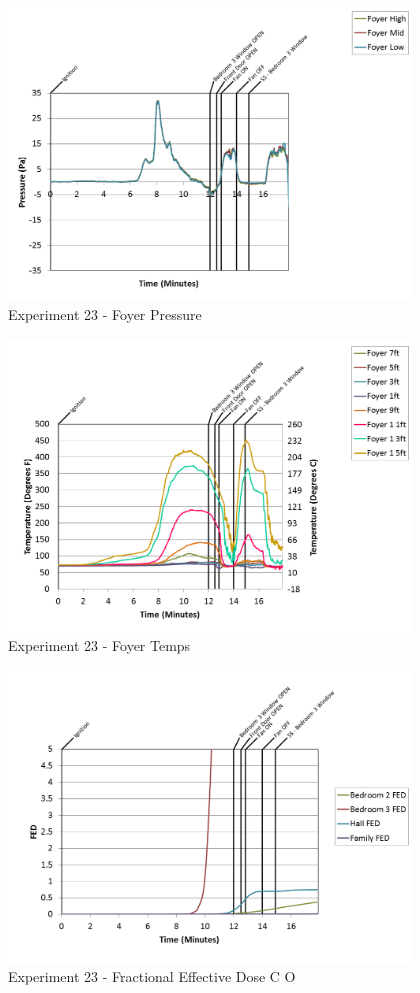 \documentclass{article}
\begin{document}
\begin{appendices}
\begin{figure}[h!]
	\centering
	\includegraphics[height=3.05in]{0_Images/Results_Charts/Exp_23_Charts/FoyerPressure.png}
	\caption{Experiment 23 - Foyer Pressure}
\end{figure}

\clearpage

\begin{figure}[h!]
	\centering
	\includegraphics[height=3.05in]{0_Images/Results_Charts/Exp_23_Charts/FoyerTemps.png}
	\caption{Experiment 23 - Foyer Temps}
\end{figure}


\begin{figure}[h!]
	\centering
	\includegraphics[height=3.05in]{0_Images/Results_Charts/Exp_23_Charts/FractionalEffectiveDoseCO.png}
	\caption{Experiment 23 - Fractional Effective Dose C O}
\end{figure}


\end{appendices}
\end{document}

